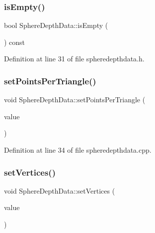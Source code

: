 \mbox{\label{struct_sphere_depth_data_acdda270334d050e23b82ad0f700c5c1c}} 
\subsubsection{\texorpdfstring{is\+Empty()}{isEmpty()}}
{\footnotesize\ttfamily bool Sphere\+Depth\+Data\+::is\+Empty (\begin{DoxyParamCaption}{ }\end{DoxyParamCaption}) const\hspace{0.3cm}{\ttfamily [inline]}}



Definition at line 31 of file spheredepthdata.\+h.

\mbox{\label{struct_sphere_depth_data_ac0d61e109f98ac7c5b7f4ea7381bc963}} 
\subsubsection{\texorpdfstring{set\+Points\+Per\+Triangle()}{setPointsPerTriangle()}}
{\footnotesize\ttfamily void Sphere\+Depth\+Data\+::set\+Points\+Per\+Triangle (\begin{DoxyParamCaption}\item[{const std\+::vector$<$ std\+::list$<$ Q\+Vector3D $>$ $>$ \&}]{value }\end{DoxyParamCaption})}



Definition at line 34 of file spheredepthdata.\+cpp.

\mbox{\label{struct_sphere_depth_data_a95e070bea3d8ec4a0449044e4616208f}} 
\subsubsection{\texorpdfstring{set\+Vertices()}{setVertices()}}
{\footnotesize\ttfamily void Sphere\+Depth\+Data\+::set\+Vertices (\begin{DoxyParamCaption}\item[{std\+::vector$<$ float $>$}]{value }\end{DoxyParamCaption})}



